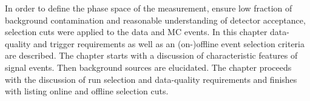 In order to define the phase space of the measurement, ensure low fraction of background contamination and reasonable understanding of detector acceptance, selection cuts were applied to the data and MC events. In this chapter data-quality and trigger requirements as well as an (on-)offline event selection criteria are described. The chapter starts with a discussion of characteristic features of signal events. Then background sources are elucidated. The chapter proceeds with the discussion of run selection and data-quality requirements and finishes with listing online and offline selection cuts.


